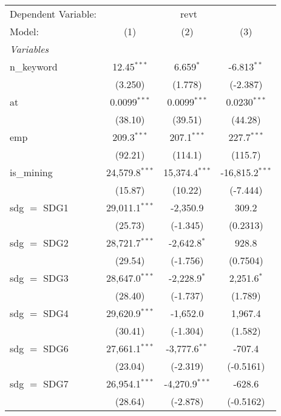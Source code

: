 
\begingroup
\centering
\begin{tabular}{lccc}
   \tabularnewline \midrule \midrule
   Dependent Variable: & \multicolumn{3}{c}{revt}\\
   Model:        & (1)              & (2)              & (3)\\  
   \midrule
   \emph{Variables}\\
   n\_keyword    & 12.45$^{***}$    & 6.659$^{*}$      & -6.813$^{**}$\\   
                 & (3.250)          & (1.778)          & (-2.387)\\   
   at            & 0.0099$^{***}$   & 0.0099$^{***}$   & 0.0230$^{***}$\\   
                 & (38.10)          & (39.51)          & (44.28)\\   
   emp           & 209.3$^{***}$    & 207.1$^{***}$    & 227.7$^{***}$\\   
                 & (92.21)          & (114.1)          & (115.7)\\   
   is\_mining    & 24,579.8$^{***}$ & 15,374.4$^{***}$ & -16,815.2$^{***}$\\   
                 & (15.87)          & (10.22)          & (-7.444)\\   
   sdg $=$ SDG1  & 29,011.1$^{***}$ & -2,350.9         & 309.2\\   
                 & (25.73)          & (-1.345)         & (0.2313)\\   
   sdg $=$ SDG2  & 28,721.7$^{***}$ & -2,642.8$^{*}$   & 928.8\\   
                 & (29.54)          & (-1.756)         & (0.7504)\\   
   sdg $=$ SDG3  & 28,647.0$^{***}$ & -2,228.9$^{*}$   & 2,251.6$^{*}$\\   
                 & (28.40)          & (-1.737)         & (1.789)\\   
   sdg $=$ SDG4  & 29,620.9$^{***}$ & -1,652.0         & 1,967.4\\   
                 & (30.41)          & (-1.304)         & (1.582)\\   
   sdg $=$ SDG6  & 27,661.1$^{***}$ & -3,777.6$^{**}$  & -707.4\\   
                 & (23.04)          & (-2.319)         & (-0.5161)\\   
   sdg $=$ SDG7  & 26,954.1$^{***}$ & -4,270.9$^{***}$ & -628.6\\   
                 & (28.64)          & (-2.878)         & (-0.5162)\\   

\end{tabular}
